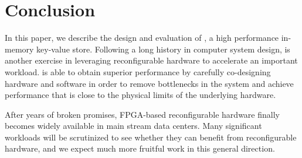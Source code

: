 \section{Conclusion}
\label{sec:conclusion}
In this paper, we describe the design and evaluation of \oursys{}, a high performance in-memory key-value store. Following a long history in computer system design, \oursys{} is another exercise in leveraging reconfigurable hardware to accelerate an important workload. \oursys{} is able to obtain superior performance by carefully co-designing hardware and software in order to remove bottlenecks in the system and achieve performance that is close to the physical limits of the underlying hardware.

After years of broken promises, FPGA-based reconfigurable hardware  finally becomes widely available in main stream data centers. Many significant workloads will be scrutinized to see whether they can benefit from reconfigurable hardware, and we expect much more fruitful work in this general direction. 